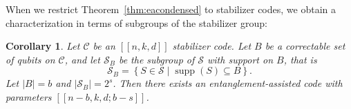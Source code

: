 \documentclass[]{amsart}
\DeclareMathOperator{\supp}{supp}
\newtheorem{corollary}[theorem]{Corollary}
\begin{document}
When we restrict Theorem~\ref{thm:eacondensed} to stabilizer codes, we obtain a characterization in terms of subgroups of the stabilizer group:

\begin{corollary}\label{thm:stabcompressed}
    Let $\mathcal{C}$ be an $\left[\!\left[n,k,d\right]\!\right]$ stabilizer code. Let $B$ be a correctable set of qubits on $\mathcal{C}$, and let $\mathcal{S}_B$ be the subgroup of $\mathcal{S}$ with support on $B$, that is
    \begin{equation*}
        \mathcal{S}_B=\left\{S\in\mathcal{S}\mid \supp\!\left(S\right)\subseteq B\right\}.
    \end{equation*}
    Let $\left\lvert B\right\rvert=b$ and $\left\lvert \mathcal{S}_B\right\rvert=2^s$.
    Then there exists an entanglement-assisted code with parameters $\left[\!\left[n-b,k,d;b-s\right]\!\right]$.
\end{corollary}
\end{document}
